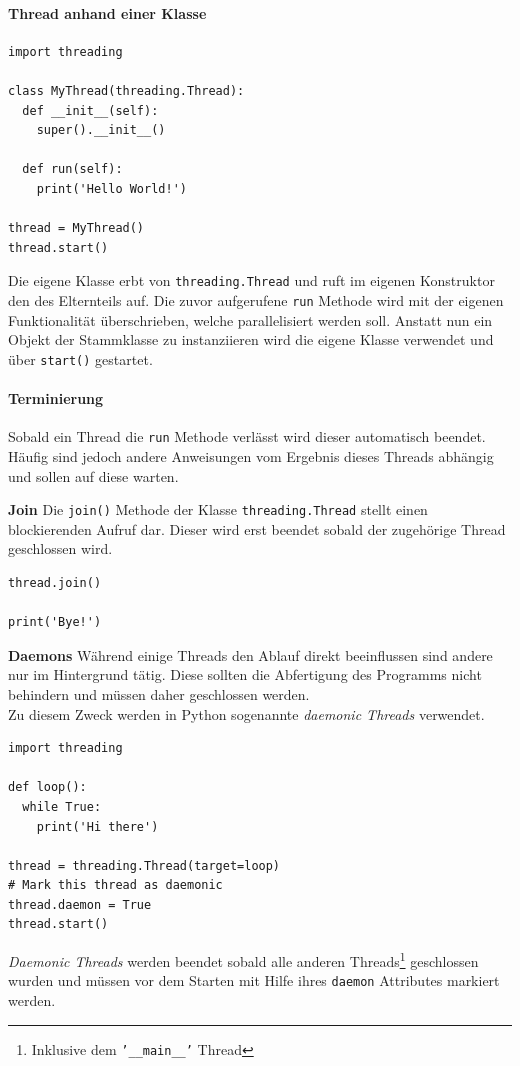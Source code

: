 \documentclass[a4paper,11pt]{article}
\begin{document}
\paragraph{Thread anhand einer Klasse}
\begin{verbatim}
import threading

class MyThread(threading.Thread):
  def __init__(self):
    super().__init__()

  def run(self):
    print('Hello World!')

thread = MyThread()
thread.start()
\end{verbatim}
Die eigene Klasse erbt von \texttt{threading.Thread} und ruft im eigenen Konstruktor den des Elternteils auf.
Die zuvor aufgerufene \texttt{run} Methode wird mit der eigenen Funktionalit\"at \"uberschrieben, welche parallelisiert werden soll.
Anstatt nun ein Objekt der Stammklasse zu instanziieren wird die eigene Klasse verwendet und \"uber \texttt{start()} gestartet.

\newpage
\paragraph{Terminierung}
\begin{flushleft}
Sobald ein Thread die \texttt{run} Methode verl\"asst wird dieser automatisch beendet.
H\"aufig sind jedoch andere Anweisungen vom Ergebnis dieses Threads abh\"angig und sollen auf diese warten.
\end{flushleft}
\textbf{Join}\quad
Die \texttt{join()} Methode der Klasse \texttt{threading.Thread} stellt einen blockierenden Aufruf dar.
Dieser wird erst beendet sobald der zugeh\"orige Thread geschlossen wird.
\begin{verbatim}
thread.join()

print('Bye!')
\end{verbatim}
\textbf{Daemons}\quad
W\"ahrend einige Threads den Ablauf direkt beeinflussen sind andere nur im Hintergrund t\"atig.
Diese sollten die Abfertigung des Programms nicht behindern und m\"ussen daher geschlossen werden.\\
Zu diesem Zweck werden in Python sogenannte \textit{daemonic Threads} verwendet.
\vspace{0.5 em}
\begin{verbatim}
import threading

def loop():
  while True:
    print('Hi there')

thread = threading.Thread(target=loop)
# Mark this thread as daemonic
thread.daemon = True
thread.start()
\end{verbatim}
\textit{Daemonic Threads} werden beendet sobald alle anderen Threads\footnote{Inklusive dem \texttt{'__main__'} Thread} geschlossen wurden und m\"ussen vor dem Starten mit Hilfe ihres \texttt{daemon} Attributes markiert werden.
\end{document}
